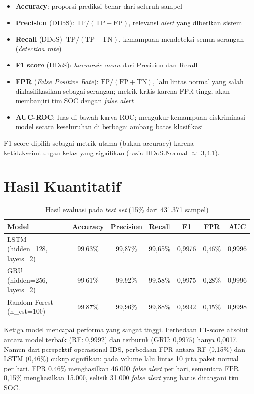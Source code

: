\documentclass[11pt,a4paper,oneside]{report}
\begin{document}
\begin{itemize}[leftmargin=*]
    \item \textbf{Accuracy}: proporsi prediksi benar dari seluruh sampel
    \item \textbf{Precision} (DDoS): $\text{TP} / (\text{TP} + \text{FP})$, relevansi \textit{alert} yang diberikan sistem
    \item \textbf{Recall} (DDoS): $\text{TP} / (\text{TP} + \text{FN})$, kemampuan mendeteksi semua serangan (\textit{detection rate})
    \item \textbf{F1-score} (DDoS): \textit{harmonic mean} dari Precision dan Recall
    \item \textbf{FPR} (\textit{False Positive Rate}): $\text{FP} / (\text{FP} + \text{TN})$, lalu lintas normal yang salah diklasifikasikan sebagai serangan; metrik kritis karena FPR tinggi akan membanjiri tim SOC dengan \textit{false alert}
    \item \textbf{AUC-ROC}: luas di bawah kurva ROC; mengukur kemampuan diskriminasi model secara keseluruhan di berbagai ambang batas klasifikasi
\end{itemize}

F1-score dipilih sebagai metrik utama (bukan accuracy) karena ketidakseimbangan kelas yang signifikan (rasio DDoS:Normal $\approx$ 3,4:1).

\section{Hasil Kuantitatif}

\begin{table}[h!]
\centering
\caption{Hasil evaluasi pada \textit{test set} (15\% dari 431.371 sampel)}
\label{tab:hasil-utama}
\begin{tabular}{lcccccc}
\toprule
\textbf{Model} & \textbf{Accuracy} & \textbf{Precision} & \textbf{Recall} & \textbf{F1} & \textbf{FPR} & \textbf{AUC} \\
\midrule
LSTM (hidden=128, layers=2) & 99,63\% & 99,87\% & 99,65\% & 0,9976 & 0,46\% & 0,9996 \\
GRU  (hidden=256, layers=2) & 99,61\% & 99,92\% & 99,58\% & 0,9975 & 0,28\% & 0,9996 \\
Random Forest (n\_est=100)  & 99,87\% & 99,96\% & 99,88\% & 0,9992 & 0,15\% & 0,9998 \\
\bottomrule
\end{tabular}
\end{table}

Ketiga model mencapai performa yang sangat tinggi. Perbedaan F1-score absolut antara model terbaik (RF: 0,9992) dan terburuk (GRU: 0,9975) hanya 0,0017. Namun dari perspektif operasional IDS, perbedaan FPR antara RF (0,15\%) dan LSTM (0,46\%) cukup signifikan: pada volume lalu lintas 10 juta paket normal per hari, FPR 0,46\% menghasilkan 46.000 \textit{false alert} per hari, sementara FPR 0,15\% menghasilkan 15.000, selisih 31.000 \textit{false alert} yang harus ditangani tim SOC.
\end{document}
